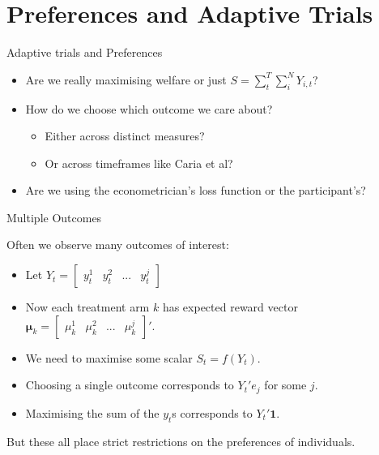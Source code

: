 \documentclass[aspectratio=169,xcolor=dvipsnames]{beamer}
\begin{document}
\section{Preferences and Adaptive Trials}

\begin{frame}{Adaptive trials and Preferences}
        \begin{itemize}
            \item Are we really maximising welfare or just $S = \sum_t^T\sum_i^N Y_{i,t}$?
            \item How do we choose which outcome we care about?
             \begin{itemize}
                 \item Either across distinct measures?
                 \item Or across timeframes like Caria et al?
             \end{itemize}
             \item Are we using the econometrician's loss function or the participant's? 
    \end{itemize}
\end{frame}


\begin{frame}{Multiple Outcomes}

Often we observe many outcomes of interest:

\begin{itemize}
    \item Let  $Y_t = \begin{bmatrix} y^1_t & y^2_t & ... & y^j_t\end{bmatrix}$
    \item Now each treatment arm $k$ has expected reward vector $\bm{\mu}_k = \begin{bmatrix}
    \mu^1_k & \mu^2_k & ... & \mu^j_k
\end{bmatrix}'$. 
    \item We need to maximise some scalar $S_t = f(Y_t)$.
    \item Choosing a single outcome corresponds to $Y_t' e_j$ for some $j$.
    \item Maximising the sum of the $y_t$s corresponds to $Y_t' \mathbf{1}$.
\end{itemize}


But these all place strict restrictions on the preferences of individuals.
\end{frame}
\end{document}
